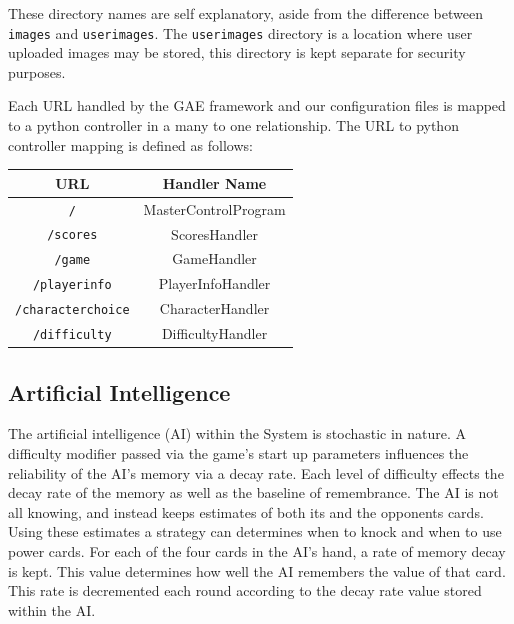 \documentclass[12pt]{IEEEtran}
\begin{document}
	These directory names are self explanatory, aside from the difference between \texttt{images} and \texttt{userimages}. 			The \texttt{userimages} directory is a location where user uploaded images may be stored, this directory is kept 				separate for security purposes. 

	Each URL handled by the GAE framework and our configuration files is mapped to a python controller in a many to one 			relationship. The URL to python controller mapping is defined as follows:
	
	\begin{center}
		\begin{tabular}{| c | c |}\hline
			\multicolumn{1}{|c}{URL} & \multicolumn{1}{c|}{ Handler Name }\\\hline
			 \texttt{/}			& MasterControlProgram\\\hline
			 \texttt{/scores} 		& ScoresHandler\\\hline
			 \texttt{/game} 		& GameHandler\\\hline
			 \texttt{/playerinfo}	& PlayerInfoHandler\\\hline
			 \texttt{/characterchoice} & CharacterHandler\\\hline
			 \texttt{/difficulty}		& DifficultyHandler\\\hline
		\end{tabular}
	\end{center}

\subsection{Artificial Intelligence}
\label{subsec:ai}

	The artificial intelligence (AI) within the System is stochastic in nature. A difficulty modifier passed via the game's start up 	parameters influences the reliability of the AI's memory via a decay rate. Each level of difficulty effects the decay rate 			of the memory as well as the baseline of remembrance. The AI is not all knowing, and instead keeps estimates of both its and 			the opponents cards. Using these estimates a strategy can determines when to knock and when to use 			power cards. For each of the four cards in the AI's hand, a rate of memory decay is kept. This value determines how well 	the AI remembers the value of that card. This rate is decremented each round according to the decay rate value 				stored within the AI.
\end{document}
